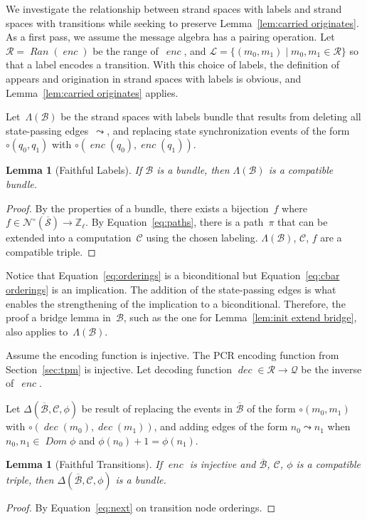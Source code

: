 \documentclass[12pt]{article}
\newtheorem{lem}[thm]{Lemma}
\newcommand{\fn}[1]{\ensuremath{\operatorname{\mathit{#1}}}}
\newcommand{\neutral}{\mathord\circ}
\newcommand{\zed}{\ensuremath{\mathbb{Z}}}
\newcommand{\ssp}{\ensuremath{\mathcal{S}}}
\newcommand{\bun}{\ensuremath{\mathcal{B}}}
\newcommand{\sta}{\ensuremath{\mathcal{Q}}}
\newcommand{\nodes}{\ensuremath{\mathcal{N}}}
\newcommand{\nnodes}{\nodes^{\neutral}}
\newcommand{\pth}{\ensuremath{\pi}}
\newcommand{\encode}{\fn{enc}}
\newcommand{\decode}{\fn{dec}}
\newcommand{\eran}{\ensuremath{\mathcal{R}}}
\newcommand{\dom}{\fn{Dom}}
\newcommand{\ran}{\fn{Ran}}
\newcommand{\comp}{\ensuremath{\mathcal{C}}}
\newcommand{\lab}{\ensuremath{\mathcal{L}}}
\newcommand{\cbar}[1]{\ensuremath{\overline{#1}}}
\begin{document}
We investigate the relationship between strand spaces with labels and
strand spaces with transitions while seeking to preserve
Lemma~\ref{lem:carried originates}.  As a first pass, we assume the
message algebra has a pairing operation.  Let $\eran=\ran(\encode)$ be
the range of~\encode, and $\lab=\{(m_0,m_1)\mid m_0,m_1\in\eran\}$ so
that a label encodes a transition.  With this choice of labels, the
definition of appears and origination in strand spaces with labels is
obvious, and Lemma~\ref{lem:carried originates} applies.

Let~$\Lambda(\bun)$ be the strand spaces with labels bundle that
results from deleting all state-passing edges~$\leadsto$, and
replacing state synchronization events of the form $\neutral(q_0,q_1)$
with $\neutral(\encode(q_0),\encode(q_1))$.

\begin{lem}[Faithful Labels]\label{lem:faithful labels}
  If {\bun} is a bundle, then $\Lambda(\bun)$ is a compatible bundle.
\end{lem}
\begin{proof}
  By the properties of a bundle, there exists a bijection~$f$ where
  $f\in\nnodes(\cbar\ssp)\to\zed_\ell$.  By Equation~\ref{eq:paths}, there
  is a path~$\pth$ that can be extended into a computation~{\comp}
  using the chosen labeling.  $\Lambda(\bun)$, \comp, $f$ are a
  compatible triple.
\end{proof}

Notice that Equation~\ref{eq:orderings} is a biconditional but
Equation~\ref{eq:cbar orderings} is an implication.  The addition of
the state-passing edges is what enables the strengthening of the
implication to a biconditional.  Therefore, the proof a bridge lemma
in~\bun, such as the one for Lemma~\ref{lem:init extend bridge}, also
applies to~$\Lambda(\bun)$.

Assume the encoding function is injective.  The PCR encoding function
from Section~\ref{sec:tpm} is injective.  Let decoding function
$\decode\in\eran\to\sta$ be the inverse of~\encode.

Let $\Delta(\cbar\bun,\comp,\phi)$ be result of replacing the events
in \cbar{\bun} of the form $\neutral(m_0, m_1)$ with
$\neutral(\decode(m_0),\decode(m_1))$, and adding edges of the form
$n_0\leadsto n_1$ when $n_0,n_1\in\dom\phi$ and
$\phi(n_0)+1=\phi(n_1)$.

\begin{lem}[Faithful Transitions]\label{lem:faithful transitions}
  If {\encode} is injective and {\cbar\bun}, \comp, $\phi$ is a
  compatible triple, then $\Delta(\cbar\bun,\comp,\phi)$ is a bundle.
\end{lem}
\begin{proof}
  By Equation~\ref{eq:next} on transition node orderings.
\end{proof}
\end{document}
